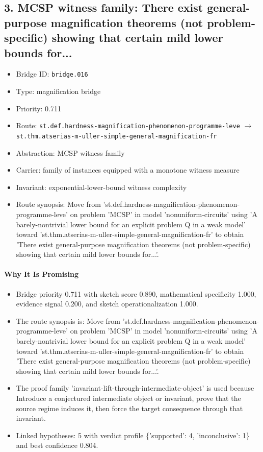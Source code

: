 \documentclass[11pt]{article}
\begin{document}
\subsection{3. MCSP witness family: There exist general-purpose magnification theorems (not problem-specific) showing that certain mild lower bounds for...}
\begin{itemize}[leftmargin=*,itemsep=0.25em]
\item Bridge ID: \texttt{bridge.016}
\item Type: magnification bridge
\item Priority: 0.711
\item Route: \texttt{st.def.hardness-magnification-phenomenon-programme-leve} $\rightarrow$ \texttt{st.thm.atserias-m-uller-simple-general-magnification-fr}
\item Abstraction: MCSP witness family
\item Carrier: family of instances equipped with a monotone witness measure
\item Invariant: exponential-lower-bound witness complexity
\item Route synopsis: Move from 'st.def.hardness-magnification-phenomenon-programme-leve' on problem 'MCSP' in model 'nonuniform-circuits' using 'A barely-nontrivial lower bound for an explicit problem Q in a weak model' toward 'st.thm.atserias-m-uller-simple-general-magnification-fr' to obtain 'There exist general-purpose magnification theorems (not problem-specific) showing that certain mild lower bounds for...'.
\end{itemize}
\paragraph{Why It Is Promising}
\begin{itemize}[leftmargin=*,itemsep=0.2em]
\item Bridge priority 0.711 with sketch score 0.890, mathematical specificity 1.000, evidence signal 0.200, and sketch operationalization 1.000.
\item The route synopsis is: Move from 'st.def.hardness-magnification-phenomenon-programme-leve' on problem 'MCSP' in model 'nonuniform-circuits' using 'A barely-nontrivial lower bound for an explicit problem Q in a weak model' toward 'st.thm.atserias-m-uller-simple-general-magnification-fr' to obtain 'There exist general-purpose magnification theorems (not problem-specific) showing that certain mild lower bounds for...'.
\item The proof family 'invariant-lift-through-intermediate-object' is used because Introduce a conjectured intermediate object or invariant, prove that the source regime induces it, then force the target consequence through that invariant.
\item Linked hypotheses: 5 with verdict profile \{'supported': 4, 'inconclusive': 1\} and best confidence 0.804.
\end{itemize}
\end{document}
